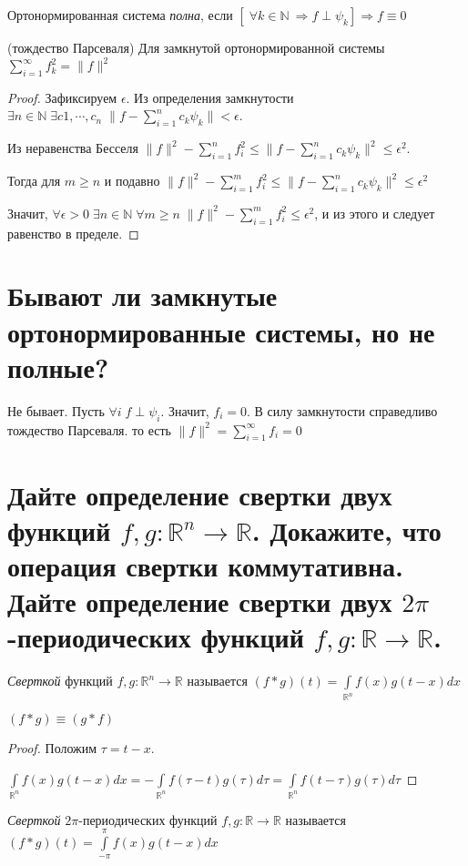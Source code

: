 \documentclass{article}
\begin{document}
	\begin{definition}
		Ортонормированная система \textit{полна}, если $[\; \forall k \in \mathbb{N} \ \Rightarrow f \perp \psi_k] \Rightarrow f \equiv 0$
	\end{definition}

	\begin{theorem} 
		(тождество Парсеваля) Для замкнутой ортонормированной системы  $\sum_{i=1}^{\infty} f_k^2 = \| f \|^2$ 
	\end{theorem}
	\begin{proof}
		Зафиксируем $\epsilon$.
		Из определения замкнутости $\exists n \in \mathbb{N} \; \exists c1, \cdots, c_n \; \| f-\sum_{i=1}^{n} c_k \psi_k\| < \epsilon$. 
		
		Из неравенства Бесселя $\|f\|^2-\sum_{i=1}^{n} f_i ^2 \le \| f-\sum_{i=1}^{n} c_k \psi_k\|^2 \le \epsilon^2$. 
		
		Тогда для $m \ge n$ и подавно $\|f\|^2-\sum_{i=1}^{m} f_i ^2 \le \| f-\sum_{i=1}^{n} c_k \psi_k\|^2 \le \epsilon^2$
		
		Значит, $\forall \epsilon > 0 \; \exists n \in \mathbb{N} \; \forall m \ge n \; \|f\|^2-\sum_{i=1}^{m} f_i ^2 \le \epsilon^2$, и из этого и следует равенство в пределе.
	\end{proof}
	
	\section{Бывают ли замкнутые ортонормированные системы, но не полные?}
	
	Не бывает. Пусть $\forall i \; f\perp \psi_i$. Значит, $f_i=0$. В силу замкнутости справедливо тождество Парсеваля. то есть $\|f\|^2=\sum_{i=1}^{\infty}f_i=0$
	
	\section{Дайте определение свертки двух функций $f, g: \mathbb{R}^n \to \mathbb{R}$. Докажите, что операция свертки коммутативна. Дайте определение свертки двух $2\pi$-периодических функций $f, g: \mathbb{R} \to \mathbb{R}$.}
	
	\begin{definition}
		\textit{Сверткой} функций $f, g: \mathbb{R}^n \to \mathbb{R}$ называется $(f*g)(t)=\int\limits_{\mathbb{R}^n} f(x)g(t-x)dx$
	\end{definition}

	\begin{theorem} 
		$(f*g) \equiv (g*f)$ 
	\end{theorem}
	\begin{proof}
		Положим $\tau=t-x$.
		
		$\int\limits_{\mathbb{R}^n} f(x)g(t-x)dx=-\int\limits_{\mathbb{R}^n} f(\tau-t)g(\tau)d\tau=\int\limits_{\mathbb{R}^n} f(t-\tau)g(\tau)d\tau$
	\end{proof}
	\begin{definition}
		\textit{Сверткой} $2\pi$-периодических функций $f, g: \mathbb{R} \to \mathbb{R}$ называется $(f*g)(t)=\int\limits_{-\pi}^{\pi} f(x)g(t-x)dx$
	\end{definition}
	
\end{document}
